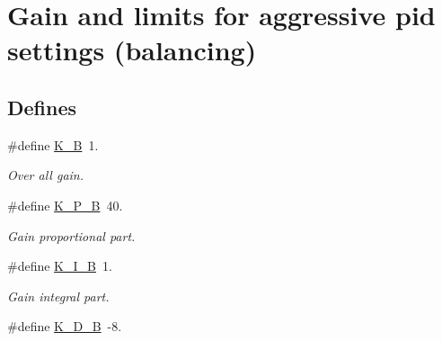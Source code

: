 \hypertarget{group___p_i_d___a_g_g_r_e_s_s_i_v_e}{\section{\-Gain and limits for aggressive pid settings (balancing)}
\label{group___p_i_d___a_g_g_r_e_s_s_i_v_e}
}
\subsection*{\-Defines}
\begin{DoxyCompactItemize}
\item 
\hypertarget{group___p_i_d___a_g_g_r_e_s_s_i_v_e_ga73bafe212f4c3da58fea7ffdf1a69d73}{\#define \hyperlink{group___p_i_d___a_g_g_r_e_s_s_i_v_e_ga73bafe212f4c3da58fea7ffdf1a69d73}{\-K\-\_\-\-B}~1.}\label{group___p_i_d___a_g_g_r_e_s_s_i_v_e_ga73bafe212f4c3da58fea7ffdf1a69d73}

\begin{DoxyCompactList}\small\item\em \-Over all gain. \end{DoxyCompactList}\item 
\hypertarget{group___p_i_d___a_g_g_r_e_s_s_i_v_e_ga72429fabe354ba67b6d34d5e4b039880}{\#define \hyperlink{group___p_i_d___a_g_g_r_e_s_s_i_v_e_ga72429fabe354ba67b6d34d5e4b039880}{\-K\-\_\-\-P\-\_\-\-B}~40.}\label{group___p_i_d___a_g_g_r_e_s_s_i_v_e_ga72429fabe354ba67b6d34d5e4b039880}

\begin{DoxyCompactList}\small\item\em \-Gain proportional part. \end{DoxyCompactList}\item 
\hypertarget{group___p_i_d___a_g_g_r_e_s_s_i_v_e_gacf52a78e5aa65678875a845d0af9cba4}{\#define \hyperlink{group___p_i_d___a_g_g_r_e_s_s_i_v_e_gacf52a78e5aa65678875a845d0af9cba4}{\-K\-\_\-\-I\-\_\-\-B}~1.}\label{group___p_i_d___a_g_g_r_e_s_s_i_v_e_gacf52a78e5aa65678875a845d0af9cba4}

\begin{DoxyCompactList}\small\item\em \-Gain integral part. \end{DoxyCompactList}\item 
\hypertarget{group___p_i_d___a_g_g_r_e_s_s_i_v_e_ga81d0af88ee3b0fe4530181b2d0f65d60}{\#define \hyperlink{group___p_i_d___a_g_g_r_e_s_s_i_v_e_ga81d0af88ee3b0fe4530181b2d0f65d60}{\-K\-\_\-\-D\-\_\-\-B}~-\/8.}\label{group___p_i_d___a_g_g_r_e_s_s_i_v_e_ga81d0af88ee3b0fe4530181b2d0f65d60}


\end{DoxyCompactItemize}
